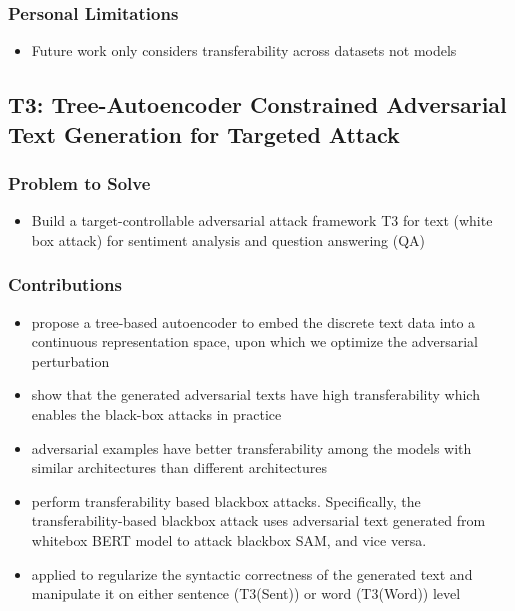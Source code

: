 \documentclass{article}
\begin{document}
\begin{flushleft}
\subsubsection*{Personal Limitations}
\begin{itemize}
    \item Future work only considers transferability across datasets not models
\end{itemize}





\subsection{T3: Tree-Autoencoder Constrained Adversarial Text Generation for Targeted Attack  \cite{wang2019t3} }
\subsubsection*{Problem to Solve}
\begin{itemize}
    \item Build a target-controllable adversarial attack framework T3 for text (white box attack) for sentiment analysis and question answering (QA)
\end{itemize}

\subsubsection*{Contributions}
\begin{itemize}
  \item propose a tree-based autoencoder to embed the discrete text data into a continuous representation space, upon which we optimize the adversarial perturbation
  \item show that the generated adversarial texts have high transferability which enables the black-box attacks in practice
  \item adversarial examples have better transferability among the models with similar architectures than different architectures
\item perform transferability based blackbox attacks. Specifically, the transferability-based blackbox attack uses adversarial text generated from whitebox BERT model to attack blackbox SAM, and vice versa.
\item applied to regularize the syntactic correctness of the generated text and manipulate it on either sentence (T3(Sent)) or word (T3(Word)) level 
\end{itemize}


\end{flushleft}
\end{document}
